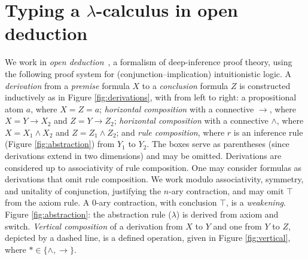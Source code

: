 \documentclass[runningheads]{llncs}
\newcommand{\set}[1]{ \{ #1 \} }
\begin{document}

\section{Typing a $\lambda$-calculus in open deduction}

\label{sec:typingacalculus}

We work in \emph{open deduction}~\cite{Guglielmi-Gundersen-Parigot-2010}, a formalism of deep-inference proof theory, using the following proof system for (conjunction--implication) intuitionistic logic. A \emph{derivation} from a \emph{premise} formula $X$ to a \emph{conclusion} formula $Z$ is constructed inductively as in Figure \ref{fig:derivations}, with from left to right: a propositional atom $a$, where $X = Z = a$; \emph{horizontal composition} with a connective $\rightarrow$, where $X = Y \rightarrow X_{2}$ and $Z = Y \rightarrow Z_{2}$; \emph{horizontal composition} with a connective $\wedge$, where $X = X_{1} \wedge X_{2}$ and $Z = Z_{1} \wedge Z_{2}$; and \emph{rule composition}, where $r$ is an inference rule (Figure \ref{fig:abstraction}) from $Y_{1}$ to $Y_{2}$. The boxes serve as parentheses (since derivations extend in two dimensions) and may be omitted. Derivations are considered up to associativity of rule composition. One may consider formulas as derivations that omit rule composition. We work modulo associativity, symmetry, and unitality of conjunction, justifying the $n$-ary contraction, and may omit $\top$ from the axiom rule. A $0$-ary contraction, with conclusion $\top$, is a \emph{weakening}. Figure \ref{fig:abstraction}: the abstraction rule ($\lambda$) is derived from axiom and switch. \emph{Vertical composition} of a derivation from $X$ to $Y$ and one from $Y$ to $Z$, depicted by a dashed line, is a defined operation, given in Figure \ref{fig:vertical}, where $* \in \set{\wedge, \rightarrow}$.
\end{document}
